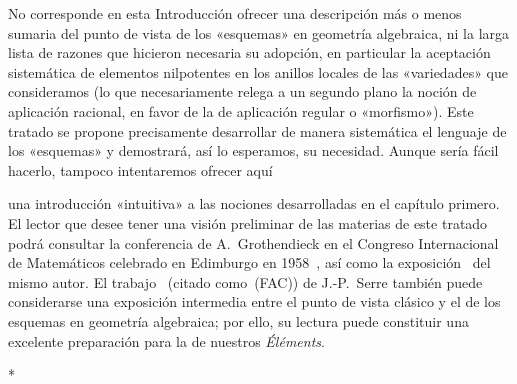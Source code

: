 No corresponde en esta Introducción ofrecer una descripción más o menos sumaria del punto de vista de los «esquemas» en geometría algebraica, ni la larga lista de razones que hicieron necesaria su adopción, en particular la aceptación sistemática de elementos nilpotentes en los anillos locales de las «variedades» que consideramos (lo que necesariamente relega a un segundo plano la noción de aplicación racional, en favor de la de aplicación regular o «morfismo»).
Este tratado se propone precisamente desarrollar de manera sistemática el lenguaje de los «esquemas» y demostrará, así lo esperamos, su necesidad.
Aunque sería fácil hacerlo, tampoco intentaremos ofrecer aquí

una introducción «intuitiva» a las nociones desarrolladas en el capítulo primero.
El lector que desee tener una visión preliminar de las materias de este tratado podrá consultar la conferencia de A.~Grothendieck en el Congreso Internacional de Matemáticos celebrado en Edimburgo en 1958~\cite{I-7}, así como la exposición~\cite{I-8} del mismo autor.
El trabajo~\cite{I-14} (citado como~(FAC)) de J.-P.~Serre también puede considerarse una exposición intermedia entre el punto de vista clásico y el de los esquemas en geometría algebraica; por ello, su lectura puede constituir una excelente preparación para la de nuestros \emph{Éléments}.

\bigskip
\begin{center}*\quad*\quad*\end{center}
\bigskip
